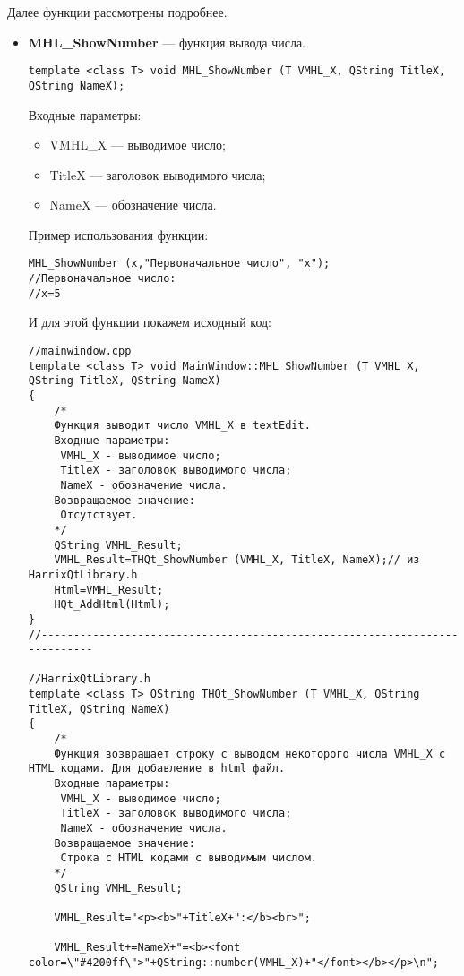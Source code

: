 Далее функции рассмотрены подробнее.

\begin{itemize}
\item \textbf{MHL\_ShowNumber} --- функция вывода числа. 
\begin{lstlisting}[label=examplefunction13, caption=Синтаксис функции MHL\_ShowNumber]
template <class T> void MHL_ShowNumber (T VMHL_X, QString TitleX, QString NameX);
\end{lstlisting}
Входные параметры: 
\begin{itemize}   
    \item  VMHL\_X --- выводимое число;
     \item TitleX --- заголовок выводимого числа;
     \item NameX --- обозначение числа.
\end{itemize}
Пример использования функции:
\begin{lstlisting}[label=examplefunction10, caption=Пример использования MHL\_ShowNumber]
MHL_ShowNumber (x,"Первоначальное число", "x");
//Первоначальное число:
//x=5
\end{lstlisting}
И для этой функции покажем исходный код:
\begin{lstlisting}[label=examplefunction11, caption=Реализация функции MHL\_ShowNumber]
//mainwindow.cpp
template <class T> void MainWindow::MHL_ShowNumber (T VMHL_X, QString TitleX, QString NameX)
{
    /*
    Функция выводит число VMHL_X в textEdit.
    Входные параметры:
     VMHL_X - выводимое число;
     TitleX - заголовок выводимого числа;
     NameX - обозначение числа.
    Возвращаемое значение:
     Отсутствует.
    */
    QString VMHL_Result;
    VMHL_Result=THQt_ShowNumber (VMHL_X, TitleX, NameX);// из HarrixQtLibrary.h
    Html=VMHL_Result;
    HQt_AddHtml(Html);
}
//---------------------------------------------------------------------------

//HarrixQtLibrary.h
template <class T> QString THQt_ShowNumber (T VMHL_X, QString TitleX, QString NameX)
{
    /*
    Функция возвращает строку с выводом некоторого числа VMHL_X с HTML кодами. Для добавление в html файл.
    Входные параметры:
     VMHL_X - выводимое число;
     TitleX - заголовок выводимого числа;
     NameX - обозначение числа.
    Возвращаемое значение:
     Строка с HTML кодами с выводимым числом.
    */
    QString VMHL_Result;

    VMHL_Result="<p><b>"+TitleX+":</b><br>";

    VMHL_Result+=NameX+"=<b><font color=\"#4200ff\">"+QString::number(VMHL_X)+"</font></b></p>\n";


\end{lstlisting}
\end{itemize}
